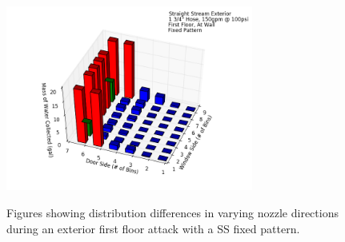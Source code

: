 \documentclass{article}
\begin{document}
\begin{figure}[ht]
\begin{tabular*}{\textwidth}{lr}
\end{tabular*}
\centering
\includegraphics[width=3.2in]{../ADD_Analysis/Figures/15-12-08_121425_Datafile_Straight_Stream_Exterior.png} \\
\caption{Figures showing distribution differences in varying nozzle directions during an exterior first floor attack with a SS fixed pattern.}
\label{fig:Exterior_First_Floor_Varying_Nozzle_Directions_SS_Fixed_Pattern}
\end{figure}

\clearpage
\end{document}
